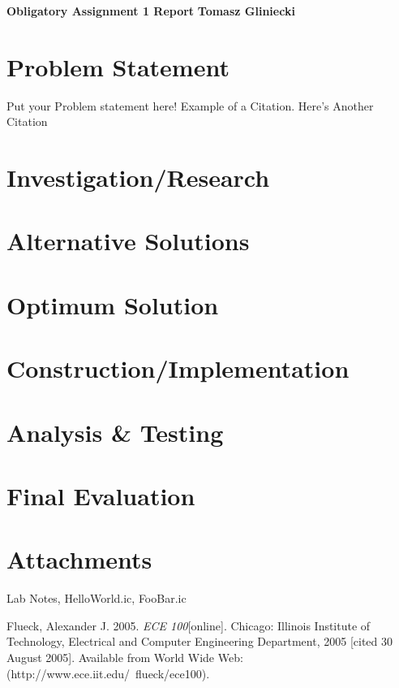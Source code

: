 \documentclass[a4paper, 11pt]{article}
\begin{document}
\noindent
\large\textbf{Obligatory Assignment 1 Report} \hfill \textbf{Tomasz Gliniecki} \\

\section*{Problem Statement}
Put your Problem statement here! Example of a Citation\cite[p.219]{Robotics}. Here's Another Citation\cite{Flueck}



\section*{Investigation/Research}


\section*{Alternative Solutions}


\section*{Optimum Solution}

\section*{Construction/Implementation}

\section*{Analysis \& Testing}

\section*{Final Evaluation}

\section*{Attachments}
Lab Notes, HelloWorld.ic, FooBar.ic

\begin{thebibliography}{9}
  
  
  Flueck, Alexander J. 2005. \emph{ECE 100}[online]. Chicago: Illinois Institute of Technology, Electrical and Computer Engineering Department, 2005 [cited 30
  August 2005]. Available from World Wide Web: (http://www.ece.iit.edu/~flueck/ece100).

\end{thebibliography}
\end{document}
